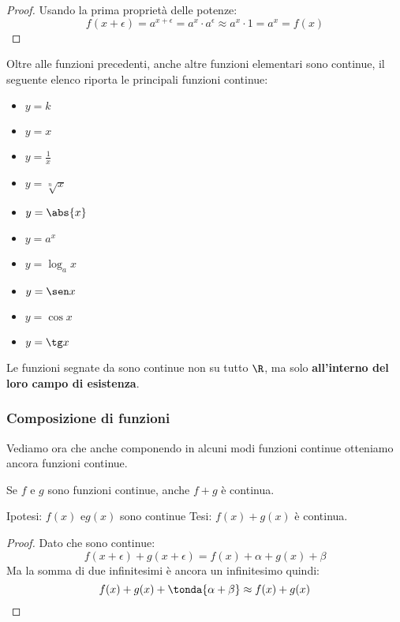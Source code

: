 \begin{proof}
Usando la prima proprietà delle potenze:
\[f(x+\epsilon) =
a^{x+\epsilon} = a^{x} \cdot a^{\epsilon} \approx a^{x} \cdot 1 = a^{x} = f(x)\]
\end{proof}

Oltre alle funzioni precedenti, anche altre funzioni elementari sono continue, 
il seguente elenco riporta le principali funzioni continue:

\begin{itemize} [noitemsep]
 \item \(y=k\)
 \item \(y=x\)
 \item \(y=\frac{1}{x}\) \quad \textasteriskcentered
 \item \(y=\sqrt[n]{x}\) \quad \textasteriskcentered
 \item \(y=\abs{x}\)
 \item \(y=a^x\)
 \item \(y=\log_a x\) \quad \textasteriskcentered
 \item \(y=\sen x\)
 \item \(y=\cos x\)
 \item \(y=\tg x\) \quad \textasteriskcentered
\end{itemize}

\begin{osservazione}
Le funzioni segnate da \textasteriskcentered sono continue non su tutto \(\R\), 
ma solo \textbf{all'interno del loro campo di esistenza}.
\end{osservazione}

\subsubsection{Composizione di funzioni}
\label{subsubsec:cont_composizionefunzioni}

Vediamo ora che anche componendo in alcuni modi funzioni continue otteniamo 
ancora funzioni continue.

\begin{teorema}
Se \(f\) e \(g\) sono funzioni continue, anche \(f+g\) è continua.
\end{teorema}

\noindent Ipotesi: 
\(f(x) \text{ e} g(x)\) sono continue
\tab Tesi: 
\(f(x)+g(x)\) è continua.

\begin{proof}
Dato che sono continue: 
\[f(x+\epsilon) + g(x+\epsilon) = f(x)+\alpha + g(x)+\beta\]
Ma la somma di due infinitesimi è ancora un infinitesimo quindi:
\[f(x)+g(x)+\tonda{\alpha + \beta} \approx f(x)+g(x)\]
\end{proof}

